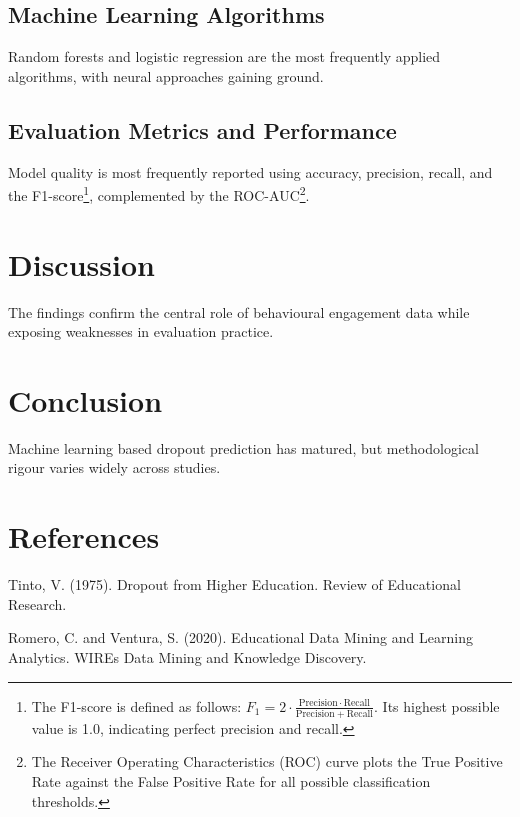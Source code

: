 \documentclass[12pt]{article}
\begin{document}
\subsection{Machine Learning Algorithms}

Random forests and logistic regression are the most frequently applied algorithms, with neural approaches gaining ground.

\subsection{Evaluation Metrics and Performance}

Model quality is most frequently reported using accuracy, precision, recall, and the F1-score\footnote{The F1-score is defined as follows: \(F_1 = 2 \cdot \frac{\mathrm{Precision} \cdot \mathrm{Recall}}{\mathrm{Precision} + \mathrm{Recall}}\). Its highest possible value is 1.0, indicating perfect precision and recall.}, complemented by the ROC-AUC\footnote{The Receiver Operating Characteristics (ROC) curve plots the True Positive Rate against the False Positive Rate for all possible classification thresholds.}.

\section{Discussion}

The findings confirm the central role of behavioural engagement data while exposing weaknesses in evaluation practice.

\section{Conclusion}

Machine learning based dropout prediction has matured, but methodological rigour varies widely across studies.

\section{References}

Tinto, V. (1975). Dropout from Higher Education. Review of Educational Research.

Romero, C. and Ventura, S. (2020). Educational Data Mining and Learning Analytics. WIREs Data Mining and Knowledge Discovery.
\end{document}
